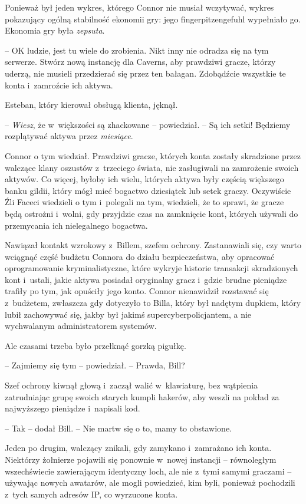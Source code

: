 \documentclass[oneside,polish,11pt,rmheadings]{mwbk}
\begin{document}
Ponieważ był jeden wykres, którego Connor nie musiał wczytywać, wykres pokazujący ogólną stabilność ekonomii gry: jego fingerpitzengefuhl wypełniało go. Ekonomia gry była \textit{zepsuta}.

-- OK ludzie, jest tu wiele do zrobienia. Nikt inny nie odradza się na tym serwerze. Stwórz nową instancję dla Caverns, aby prawdziwi gracze, którzy uderzą, nie musieli przedzierać się przez ten bałagan. Zdobądźcie wszystkie te konta i~zamroźcie ich aktywa. 

Esteban, który kierował obsługą klienta, jęknął.

-- \textit{Wiesz}, że w~większości są zhackowane -- powiedział. -- Są ich setki! Będziemy rozplątywać aktywa przez \textit{miesiące}.

Connor o tym wiedział. Prawdziwi gracze, których konta zostały skradzione przez walczące klany oszustów z~trzeciego świata, nie zasługiwali na zamrożenie swoich aktywów. Co więcej, byłoby ich wielu, których aktywa były częścią większego banku gildii, który mógł mieć bogactwo dziesiątek lub setek graczy. Oczywiście Źli Faceci wiedzieli o tym i~polegali na tym, wiedzieli, że to sprawi, że gracze będą ostrożni i~wolni, gdy przyjdzie czas na zamknięcie kont, których używali do przemycania ich nielegalnego bogactwa.

Nawiązał kontakt wzrokowy z~Billem, szefem ochrony. Zastanawiali się, czy warto wciągnąć część budżetu Connora do działu bezpieczeństwa, aby opracować oprogramowanie kryminalistyczne, które wykryje historie transakcji skradzionych kont i~ustali, jakie aktywa posiadał oryginalny gracz i~gdzie brudne pieniądze trafiły po tym, jak opuściły jego konto. Connor nienawidził rozstawać się z~budżetem, zwłaszcza gdy dotyczyło to Billa, który był nadętym dupkiem, który lubił zachowywać się, jakby był jakimś supercyberpolicjantem, a nie wychwalanym administratorem systemów.

Ale czasami trzeba było przełknąć gorzką pigułkę. 

-- Zajmiemy się tym -- powiedział. -- Prawda, Bill? 

Szef ochrony kiwnął głową i~zaczął walić w~klawiaturę, bez wątpienia zatrudniając grupę swoich starych kumpli hakerów, aby weszli na pokład za najwyższego pieniądze i~napisali kod.

-- Tak -- dodał Bill. -- Nie martw się o to, mamy to obstawione.

Jeden po drugim, walczący znikali, gdy zamykano i~zamrażano ich konta. Niektórzy żołnierze pojawili się ponownie w~nowej instancji -- równoległym wszechświecie zawierającym identyczny loch, ale nie z~tymi samymi graczami -- używając nowych awatarów, ale mogli powiedzieć, kim byli, ponieważ pochodzili z~tych samych adresów IP, co wyrzucone konta. 
\end{document}
